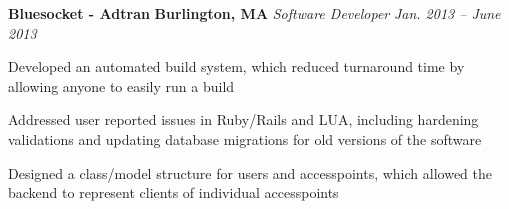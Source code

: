 \item
\headerrow
{\textbf{Bluesocket - Adtran}}
{\textbf{Burlington, MA}}
\headerrow
{\emph{Software Developer}}
{\emph{Jan. 2013 -- June 2013}}
\begin{itemize*}
    \item Developed an automated build system, which reduced turnaround time by
    allowing anyone to easily run a build
    \item Addressed user reported issues in Ruby/Rails and LUA, including
    hardening validations and updating database migrations for old versions
    of the software
    \item Designed a class/model structure for users and accesspoints, which
    allowed the backend to represent clients of individual accesspoints
\end{itemize*}
